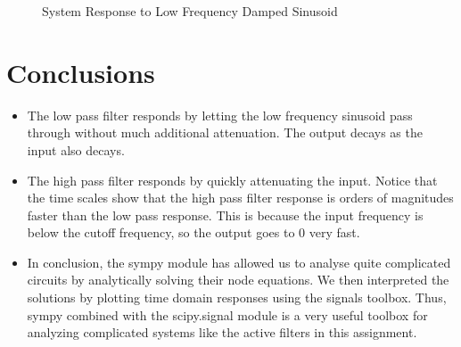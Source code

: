 \documentclass{article}
\begin{document}
\begin{figure}%
    \centering
    \qquad
    \caption{System Response to Low Frequency Damped Sinusoid}%
    \label{Figure 7}
\end{figure}




\newpage

\section*{Conclusions}\label{conclusions}

\begin{itemize}
\item
  The low pass filter responds by letting the low frequency sinusoid
  pass through without much additional attenuation. The output decays as
  the input also decays.
\item
  The high pass filter responds by quickly attenuating the input. Notice
  that the time scales show that the high pass filter response is orders
  of magnitudes faster than the low pass response. This is because the
  input frequency is below the cutoff frequency, so the output goes to
  \(0\) very fast.
\item
  In conclusion, the sympy module has allowed us to analyse quite
  complicated circuits by analytically solving their node equations. We
  then interpreted the solutions by plotting time domain responses using
  the signals toolbox. Thus, sympy combined with the scipy.signal module
  is a very useful toolbox for analyzing complicated systems like the
  active filters in this assignment.
\end{itemize}
\end{document}
